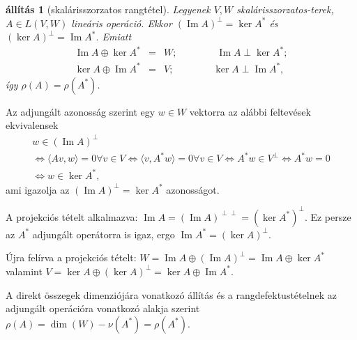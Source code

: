 \documentclass[a4paper, showtrims]{memoir}
\makeatletter
\renewenvironment{proof}[1][\proofname]
    {\par\pushQED{\qed}%
    \normalfont \topsep6\p@\@plus6\p@\relax
    \trivlist
    \item[\hskip\labelsep
        \itshape
    #1\@addpunct{:}]\ignorespaces}
    {\popQED\endtrivlist\@endpefalse}
\theoremstyle{plain}
\newtheorem{proposition}{állítás}[chapter]
\theoremstyle{remark}
\theoremstyle{definition}
\DeclareMathOperator{\im}{Im}
\newcommand{\ip}[2]{\langle#1,#2\rangle}
\makeatother
\begin{document}
\begin{proposition}[skalárisszorzatos rangtétel]\label{pr:skrang}
	Legyenek $V,W$ skalárisszorzatos-terek, $A\in L\left( V,W \right)$ lineáris operáció.
	Ekkor
	$(\im A)^\perp=\ker A^\ast$ és
	$(\ker A)^\perp=\im A^\ast.$
	Emiatt
	\begin{eqnarray*}
		\im A\oplus\ker A^\ast&=& W;\qquad\qquad\im A\perp\ker A^\ast;\\
		\ker A\oplus\im A^\ast&=& V;\qquad\qquad\ker A\perp\im A^\ast,
	\end{eqnarray*}
	így $\rho\left( A \right)=\rho\left( A^\ast \right)$.
\end{proposition}
\begin{proof}
	Az adjungált azonosság szerint egy $w\in W$ vektorra az alábbi feltevések ekvivalensek
	\begin{multline*}
		w\in\left( \im A \right)^\perp
		\\
		\iff
		\ip{Av}{w}=0 \forall v\in V
		\iff
		\ip{v}{A^\ast w}=0 \forall v\in V
		\iff
		A^\ast w\in V^\perp
		\iff
		A^\ast w=0
		\\
		\iff
		w\in\ker A^\ast,
	\end{multline*}
	ami igazolja az $\left( \im A \right)^\perp=\ker A^\ast$ azonosságot.

	A projekciós tételt alkalmazva:
	\begin{math}
		\im A=(\im A)^{\perp\perp}=(\ker A^\ast)^\perp
	\end{math}.
	Ez persze az $A^\ast$ adjungált operátorra is igaz,
	ergo
	\begin{math}
		\im A^\ast = \left( \ker A \right)^\perp.
	\end{math}

	Újra felírva a projekciós tételt:
	\begin{math}
		W=\im A\oplus\left( \im A \right)^\perp
		=\im A\oplus\ker A^\ast
	\end{math}
	valamint
	\begin{math}
		V=\ker A\oplus\left( \ker A \right)^\perp
		=
		\ker A\oplus\im A^\ast.
	\end{math}

	A direkt összegek dimenziójára vonatkozó állítás és a rangdefektustételnek az adjungált operációra vonatkozó alakja szerint
	\begin{math}
		\rho\left( A \right)=\dim(W)-\nu\left( A^\ast \right)=\rho\left( A^\ast \right).
	\end{math}
\end{proof}
\end{document}
